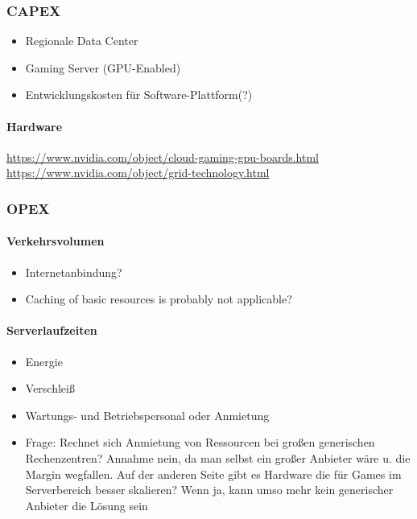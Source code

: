 \subsubsection{CAPEX}

\begin{itemize}
	\item Regionale Data Center
	\item Gaming Server (GPU-Enabled)
	\item Entwicklungskosten für Software-Plattform(?)
\end{itemize}

\paragraph{Hardware}

\url{https://www.nvidia.com/object/cloud-gaming-gpu-boards.html}
\url{https://www.nvidia.com/object/grid-technology.html}


\subsubsection{OPEX}

\paragraph{Verkehrsvolumen}

\begin{itemize}
	\item Internetanbindung?
	\item Caching of basic resources is probably not applicable?
\end{itemize}

\paragraph{Serverlaufzeiten}

\begin{itemize}
	\item Energie
	\item Verschleiß
	\item Wartungs- und Betriebspersonal oder Anmietung
	\item Frage: Rechnet sich Anmietung von Ressourcen bei großen generischen Rechenzentren? Annahme nein, da man selbst ein großer Anbieter wäre u. die Margin wegfallen. Auf der anderen Seite gibt es Hardware die für Games im Serverbereich besser skalieren? Wenn ja, kann umso mehr kein generischer Anbieter die Lösung sein
\end{itemize}

